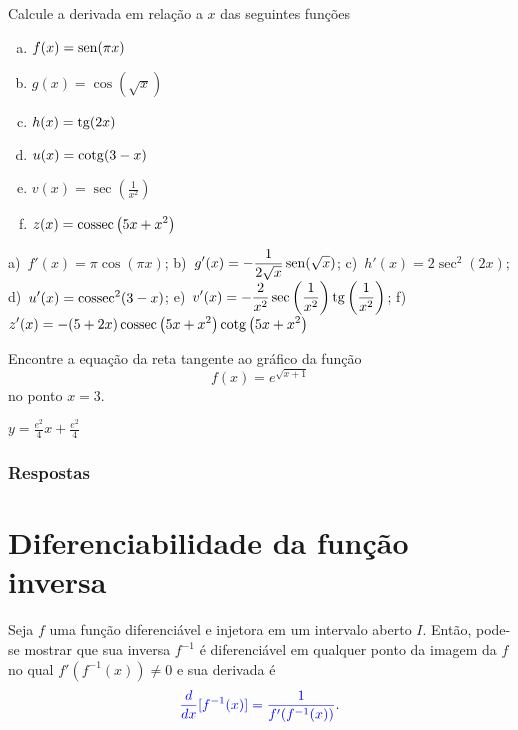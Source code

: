 \begin{exer}
  Calcule a derivada em relação a $x$ das seguintes funções
  \begin{enumerate}[a)]
  \item $\displaystyle f(x) = \operatorname{sen}(\pi x)$
  \item $\displaystyle g(x) = \cos(\sqrt{x})$
  \item $\displaystyle h(x) = \operatorname{tg}(2x)$
  \item $\displaystyle u(x) = \operatorname{cotg}(3 - x)$
  \item $\displaystyle v(x) = \sec\left(\frac{1}{x^2}\right)$
  \item $\displaystyle z(x) = \operatorname{cossec}\left(5x + x^2\right)$
  \end{enumerate}
\end{exer}
\begin{resp}
  a)~$\displaystyle f'(x) = \pi\cos(\pi x)$; b)~$\displaystyle g'(x) = -\frac{1}{2\sqrt{x}}\operatorname{sen}(\sqrt{x})$; c)~$\displaystyle h'(x) = 2\sec^2(2x)$; d)~$\displaystyle u'(x) = \operatorname{cossec}^2(3-x)$; e)~$\displaystyle v'(x) = -\frac{2}{x^2}\sec\left(\frac{1}{x^2}\right)\operatorname{tg}\left(\frac{1}{x^2}\right)$; f)~$\displaystyle z'(x) = -(5+2x)\operatorname{cossec}\left(5x + x^2\right)\operatorname{cotg}\left(5x + x^2\right)$
\end{resp}

\begin{exer}
  Encontre a equação da reta tangente ao gráfico da função
  \begin{equation}
    f(x) = e^{\sqrt{x+1}}
  \end{equation}
  no ponto $x=3$.
\end{exer}
\begin{resp}
  $y = \frac{e^2}{4}x + \frac{e^2}{4}$
\end{resp}

\ifisbook
\subsubsection{Respostas}
\shipoutAnswer
\fi


\section{Diferenciabilidade da função inversa}\label{cap_deriv_sec_funinv}

Seja $f$ uma função diferenciável e injetora em um intervalo aberto $I$. Então, pode-se mostrar que sua inversa $f^{-1}$ é diferenciável em qualquer ponto da imagem da $f$ no qual $f'(f^{-1}(x))\neq 0$ e sua derivada é
\begin{equation}\label{eq:diff_funinv}
  {\color{blue}\frac{d}{dx}[f^{-1}(x)] = \frac{1}{f'(f^{-1}(x))}}.
\end{equation}

